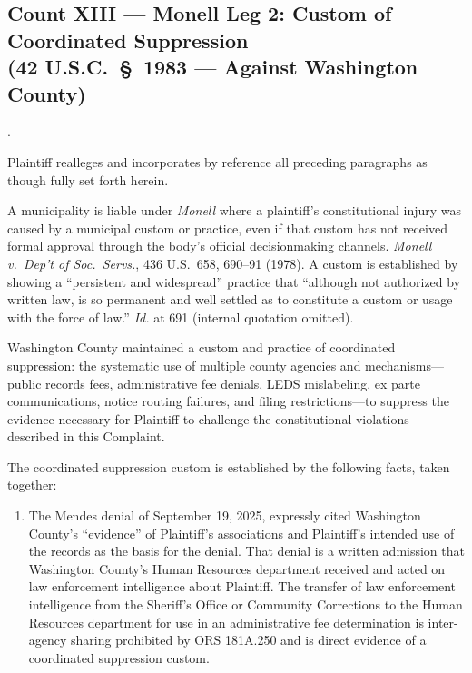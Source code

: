 \documentclass[12pt,letterpaper]{article}
\newcounter{complaintpara}
\newenvironment{paras}{%
	\begin{list}{\arabic{complaintpara}.}{%
			\setlength{\leftmargin}{0.5in}%
			\setlength{\labelwidth}{0.4in}%
			\setlength{\labelsep}{0.1in}%
			\setlength{\itemsep}{0pt}%
			\setlength{\parsep}{0pt}%
			\setlength{\topsep}{6pt}%
		}%
	}{%
	\end{list}%
}
\newenvironment{subparas}{%
	\begin{enumerate}[label=\alph*.,leftmargin=0.75in,itemsep=0pt,%
		parsep=0pt,topsep=4pt]%
	}{%
	\end{enumerate}%
}
\begin{document}
	\subsection*{Count XIII --- Monell Leg 2: Custom of Coordinated Suppression\\
		(42 U.S.C.\ \S\ 1983 --- Against Washington County)}
	\begin{paras}
		
		\item Plaintiff realleges and incorporates by reference all
		preceding paragraphs as though fully set forth herein.
		
		\item A municipality is liable under \textit{Monell} where a
		plaintiff's constitutional injury was caused by a municipal
		custom or practice, even if that custom has not received
		formal approval through the body's official decisionmaking
		channels. \textit{Monell v.\ Dep't of Soc.\ Servs.},
		436 U.S.\ 658, 690--91 (1978). A custom is established by
		showing a ``persistent and widespread'' practice that ``although not authorized by written law, is so permanent and
		well settled as to constitute a custom or usage with the
		force of law.'' \textit{Id.} at 691 (internal quotation
		omitted).
		
		\item Washington County maintained a custom and practice of
		coordinated suppression: the systematic use of multiple
		county agencies and mechanisms---public records fees,
		administrative fee denials, LEDS mislabeling, ex parte
		communications, notice routing failures, and filing
		restrictions---to suppress the evidence necessary for
		Plaintiff to challenge the constitutional violations
		described in this Complaint.
		
		\item The coordinated suppression custom is established by the
		following facts, taken together:
		
		\begin{subparas}
			
			\item The Mendes denial of September 19, 2025, expressly
			cited Washington County's ``evidence'' of Plaintiff's
			associations and Plaintiff's intended use of the records as
			the basis for the denial. That denial is a written admission
			that Washington County's Human Resources department received
			and acted on law enforcement intelligence about Plaintiff.
			The transfer of law enforcement intelligence from the
			Sheriff's Office or Community Corrections to the Human
			Resources department for use in an administrative fee
			determination is inter-agency sharing prohibited by
			ORS 181A.250 and is direct evidence of a coordinated
			suppression custom.
			

\end{subparas}
\end{paras}
\end{document}
